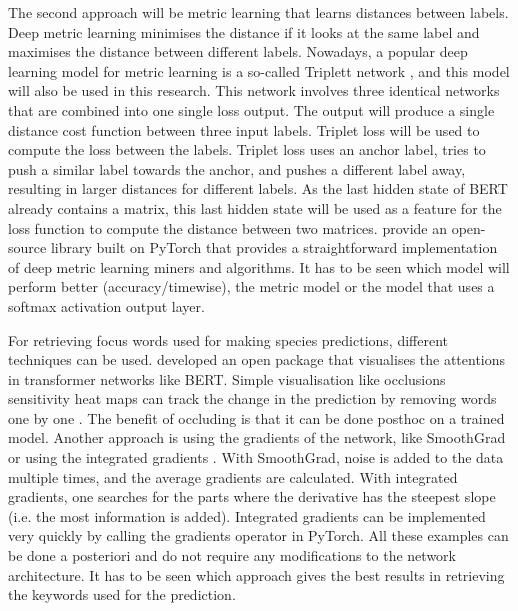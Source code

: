 \documentclass[a4paper, 12pt, oneside]{book} %
\begin{document}
The second approach will be metric learning that learns distances between labels.
Deep metric learning minimises the distance if it looks at the same label and maximises the distance between different labels.
Nowadays, a popular deep learning model for metric learning is a so-called Triplett network \autocite{hoffer_deep_2015}, and this model will also be used in this research.
This network involves three identical networks that are combined into one single loss output.
The output will produce a single distance cost function between three input labels.
Triplet loss \autocite{schroff_facenet_2015} will be used to compute the loss between the labels.
Triplet loss uses an anchor label, tries to push a similar label towards the anchor, and pushes a different label away, resulting in larger distances for different labels.
As the last hidden state of BERT already contains a matrix, this last hidden state will be used as a feature for the loss function to compute the distance between two matrices.
\textcite{musgrave_pytorch_2020} provide an open-source library built on PyTorch that provides a straightforward implementation of deep metric learning miners and algorithms.
It has to be seen which model will perform better (accuracy/timewise), the metric model or the model that uses a softmax activation output layer. 

For retrieving focus words used for making species predictions, different techniques can be used.
\textcite{vig_multiscale_2019} developed an open package that visualises the attentions in transformer networks like BERT.
Simple visualisation like occlusions sensitivity heat maps can track the change in the prediction by removing words one by one \autocite{fleet_visualizing_2014}.
The benefit of occluding is that it can be done posthoc on a trained model.
Another approach is using the gradients of the network, like SmoothGrad \autocite{smilkov_smoothgrad_2017} or using the integrated gradients \autocite{sundararajan_axiomatic_2017}.
With SmoothGrad, noise is added to the data multiple times, and the average gradients are calculated.
With integrated gradients, one searches for the parts where the derivative has the steepest slope (i.e. the most information is added).
Integrated gradients can be implemented very quickly by calling the gradients operator in PyTorch.
All these examples can be done a posteriori and do not require any modifications to the network architecture.
It has to be seen which approach gives the best results in retrieving the keywords used for the prediction.
\end{document}

